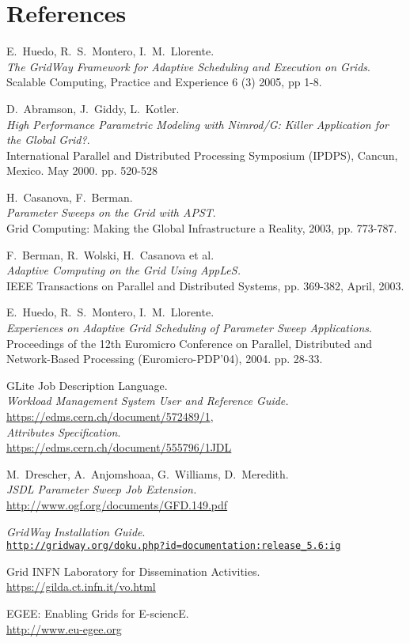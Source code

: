 \documentclass[12pt,a4paper]{article}
\begin{document}
\section*{References}
\begin{thebibliography}{10}

E.~Huedo, R.~S.~Montero, I.~M.~Llorente.\\
{\em The GridWay Framework for Adaptive Scheduling and Execution on Grids}.\\
Scalable Computing, Practice and Experience 6 (3) 2005, pp 1-8.

D.~Abramson, J.~Giddy, L.~Kotler.\\
{\em High Performance Parametric Modeling with Nimrod/G: Killer Application for the Global Grid?}.\\
 International Parallel and Distributed Processing Symposium (IPDPS), Cancun, Mexico. May 2000. pp. 520-528

H.~Casanova, F.~Berman.\\
{\em Parameter Sweeps on the Grid with APST}.\\
Grid Computing: Making the Global Infrastructure a Reality, 2003, pp. 773-787.


F.~Berman, R.~Wolski, H.~Casanova et al.\\
{\em Adaptive Computing on the Grid Using AppLeS.}\\
IEEE Transactions on Parallel and Distributed Systems, pp. 369-382, April, 2003.

E.~Huedo, R.~S.~Montero, I.~M.~Llorente.\\
{\em Experiences on Adaptive Grid Scheduling of Parameter Sweep Applications}.\\
Proceedings of the 12th Euromicro Conference on Parallel, Distributed and Network-Based Processing (Euromicro-PDP'04), 2004. pp. 28-33.

GLite Job Description Language.\\
{\em Workload Management System User and Reference Guide.}\\
\url{https://edms.cern.ch/document/572489/1},\\ 
{\em Attributes Specification}.\\
\url{https://edms.cern.ch/document/555796/1JDL}

M.~Drescher, A.~Anjomshoaa, G.~Williams, D.~Meredith.\\
{\em JSDL Parameter Sweep Job Extension.}\\
\url{http://www.ogf.org/documents/GFD.149.pdf}

{\em GridWay Installation Guide}.\\
\href{http://gridway.org/doku.php?id=documentation:release_5.6:ig}{\tt http://gridway.org/doku.php?id=documentation:release\_5.6:ig}


Grid INFN Laboratory for Dissemination Activities.\\
\url{https://gilda.ct.infn.it/vo.html}

EGEE: Enabling Grids for E-sciencE.\\
\url{http://www.eu-egee.org}
\end{thebibliography}
\end{document}
